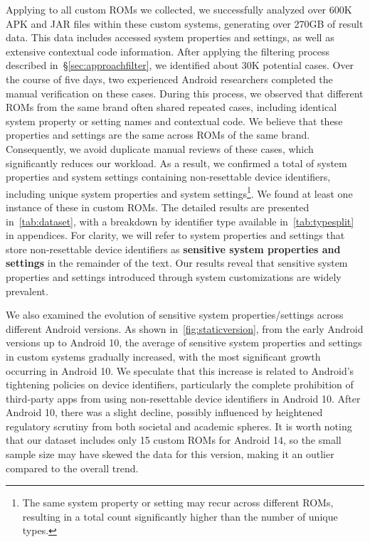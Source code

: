 Applying {\framework} to all custom ROMs we collected, we successfully analyzed over 600K APK and JAR files within these custom systems, generating over 270GB of result data. 
This data includes accessed system properties and settings, as well as extensive contextual code information.
After applying the filtering process described in~\S\ref{sec:approachfilter}, we identified about 30K potential cases.
Over the course of five days, two experienced Android researchers completed the manual verification on these cases. 
During this process, we observed that different ROMs from the same brand often shared repeated cases, including identical system property or setting names and contextual code.
We believe that these properties and settings are the same across ROMs of the same brand. 
Consequently, we avoid duplicate manual reviews of these cases, which significantly reduces our workload.
As a result, we confirmed a total of \totalsensitivepropertiescase system properties and \totalsensitivesettingscase system settings containing non-resettable device identifiers, including \totalsensitiveproperties unique system properties and \totalsensitivesettings system settings\footnote{The same system property or setting may recur across different ROMs, resulting in a total count significantly higher than the number of unique types.}.
We found at least one instance of these in \totalsensitivedevices custom ROMs. 
The detailed results are presented in~\autoref{tab:dataset}, with a breakdown by identifier type available in~\autoref{tab:typesplit} in appendices.
For clarity, we will refer to system properties and settings that store non-resettable device identifiers as \textbf{sensitive system properties and settings} in the remainder of the text.
Our results reveal that sensitive system properties and settings introduced through system customizations are widely prevalent.

We also examined the evolution of sensitive system properties/settings across different Android versions.
As shown in~\autoref{fig:staticversion}, from the early Android versions up to Android 10, the average of sensitive system properties and settings in custom systems gradually increased, with the most significant growth occurring in Android 10. 
We speculate that this increase is related to Android's tightening policies on device identifiers, particularly the complete prohibition of third-party apps from using non-resettable device identifiers in Android 10.
After Android 10, there was a slight decline, possibly influenced by heightened regulatory scrutiny from both societal and academic spheres.
It is worth noting that our dataset includes only 15 custom ROMs for Android 14, so the small sample size may have skewed the data for this version, making it an outlier compared to the overall trend.

